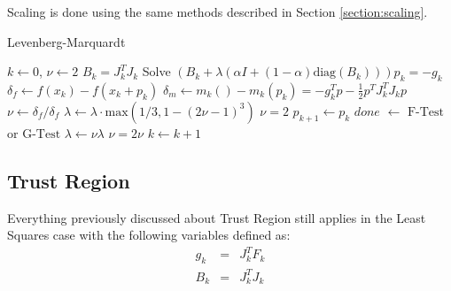 \documentclass[peerreview,compsoc,onecolumn]{IEEEtran}
\begin{document}
Scaling is done using the same methods described in Section \ref{section:scaling}.

\begin{algorithm}{}
\caption{\label{alg:levenberg_marquardt}Levenberg-Marquardt}
\begin{algorithmic}[1]
	\State $k \gets 0$, $\nu \gets 2$
  	\State $B_k = J_k^T J_k$
		\State Solve $\left(B_k + \lambda \left(\alpha I + (1-\alpha)\mbox{diag}(B_k) \right)\right) p_k = -g_k$ 
		\State $\delta_f \gets f(x_k) - f(x_k + p_k)$ 
		\State $\delta_m \gets m_k()-m_k(p_k) = -g^T_k p - \frac{1}{2}p^T J_k^T J_k p$ 
		\State $\nu \gets \delta_f / \delta_f$  
		 
			\State $\lambda \gets \lambda \cdot \mbox{max}(1/3 , 1-(2\nu-1)^3)$
			\State $\nu = 2$
			\State $p_{k+1} \gets p_k$
			\State $done$ $\gets$ $\mbox{F-Test}$ or $\mbox{G-Test}$ 
		\Else
			\State $\lambda \gets \nu \lambda$ 
			\State $\nu = 2\nu$
		\EndIf
		\State $k \gets k + 1$
	\EndWhile
\end{algorithmic}
\end{algorithm}


\subsection{Trust Region}
 Everything previously discussed about Trust Region still applies in the Least Squares case with the following variables defined as:
\begin{eqnarray}
g_k &=& J^T_k F_k  \\
B_k &=& J_k^T J_k
\end{eqnarray}



\end{document}
